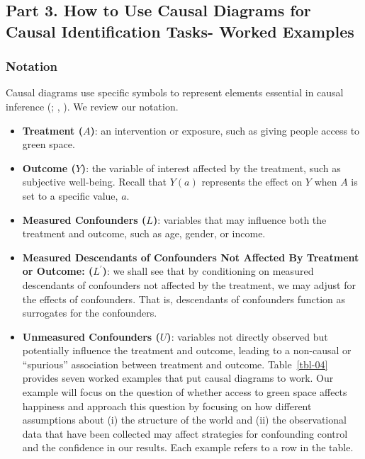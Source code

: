 \documentclass[
  singlecolumn]{article}
\providecommand{\tightlist}{%
  \setlength{\itemsep}{0pt}\setlength{\parskip}{0pt}}\usepackage{longtable,booktabs,array}
\begin{document}
\subsection{Part 3. How to Use Causal Diagrams for Causal Identification
Tasks- Worked Examples}\label{section-part3}

\subsubsection{Notation}\label{notation}

Causal diagrams use specific symbols to represent elements essential in
causal inference (; ,
). We review our notation.

\begin{itemize}
\tightlist
\item
  \textbf{Treatment (\(A\))}: an intervention or exposure, such as
  giving people access to green space.
\item
  \textbf{Outcome (\(Y\))}: the variable of interest affected by the
  treatment, such as subjective well-being. Recall that \(Y(a)\)
  represents the effect on \(Y\) when \(A\) is set to a specific value,
  \(a\).
\item
  \textbf{Measured Confounders (\(L\))}: variables that may influence
  both the treatment and outcome, such as age, gender, or income.
\item
  \textbf{Measured Descendants of Confounders Not Affected By Treatment
  or Outcome: (\(L^\prime\))}: we shall see that by conditioning on
  measured descendants of confounders not affected by the treatment, we
  may adjust for the effects of confounders. That is, descendants of
  confounders function as surrogates for the confounders.
\item
  \textbf{Unmeasured Confounders (\(U\))}: variables not directly
  observed but potentially influence the treatment and outcome, leading
  to a non-causal or ``spurious'' association between treatment and
  outcome. Table~\ref{tbl-04} provides seven worked examples that put
  causal diagrams to work. Our example will focus on the question of
  whether access to green space affects happiness and approach this
  question by focusing on how different assumptions about (i) the
  structure of the world and (ii) the observational data that have been
  collected may affect strategies for confounding control and the
  confidence in our results. Each example refers to a row in the table.
\end{itemize}
\end{document}
